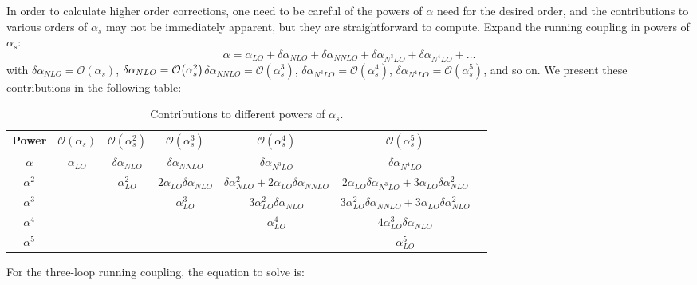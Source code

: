 \documentclass[../main.tex]{subfiles}
\begin{document}
In order to calculate higher order corrections, one need to be careful of the powers of $\alpha$ need for the desired order, 
and the contributions to various orders of $\alpha_s$ may not be immediately apparent, but they are straightforward to compute.
Expand the running coupling in powers of $\alpha_s$: 
\begin{equation}
    \alpha = \alpha_{LO} + \delta\alpha_{NLO} + \delta\alpha_{NNLO} + \delta\alpha_{N^3LO} + \delta\alpha_{N^4LO} + \ldots
\end{equation} 
with $\delta\alpha_{NLO} = \mathcal{O}(\alpha_s)$, $\delta\alpha_{NLO} = \order{\alpha_s^2}$$\delta\alpha_{NNLO} = \mathcal{O}(\alpha_s^3)$,
 $\delta\alpha_{N^3LO} = \mathcal{O}(\alpha_s^4)$, $\delta\alpha_{N^4LO} = \mathcal{O}(\alpha_s^5)$, and so on.
We present these contributions in the following table:
\begin{table}[htbp] %
    \centering
    \scriptsize
    \begin{tabular}{c c c c c c c}
        
        \textbf{Power} & $\mathcal{O}(\alpha_s)$ & $\mathcal{O}(\alpha_s^2)$ & $\mathcal{O}(\alpha_s^3)$ 
        & $\mathcal{O}(\alpha_s^4)$ & $\mathcal{O}(\alpha_s^5)$\\
     
        $\alpha$ & $\alpha_{LO}$ & $\delta\alpha_{NLO}$ & $\delta\alpha_{NNLO}$ & $\delta\alpha_{N^3LO}$ & $\delta\alpha_{N^4LO}$  \\
        $\alpha^2$ &  & $\alpha_{LO}^2$ & $2\alpha_{LO}\delta\alpha_{NLO}$ & $\delta\alpha_{NLO}^2+2\alpha_{LO}\delta\alpha_{NNLO}$ &
        $2\alpha_{LO}\delta\alpha_{N^3LO}+3\alpha_{LO}\delta\alpha_{NLO}^2$ \\
        $\alpha^3$ &  & & $\alpha_{LO}^3$ & $3\alpha_{LO}^2 \delta\alpha_{NLO}$& $3\alpha_{LO}^2\delta\alpha_{NNLO}+3\alpha_{LO}\delta\alpha_{NLO}^2$  \\
        $\alpha^4$ &  & & & $\alpha_{LO}^4$ & $4 \alpha_{LO}^3 \delta\alpha_{NLO}$  \\
        $\alpha^5$ &  & & & & $\alpha_{LO}^5$ \\
    \end{tabular}
    
    \caption{Contributions to different powers of $\alpha_s$.}
    \label{tab:contributions to different powers of alpha_s}
\end{table}

For the three-loop running coupling, the equation to solve is:
\end{document}
